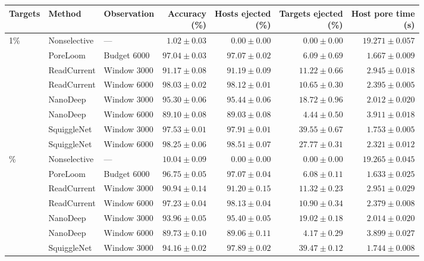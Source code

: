 \begingroup\setlength{\tabcolsep}{3.5pt}
\begin{tabular}{@{}lllrrrr@{}}
\toprule
Targets & Method & Observation & \shortstack{Accuracy\\(\%)} & \shortstack{Hosts ejected\\(\%)} & \shortstack{Targets ejected\\(\%)} & \shortstack{Host pore time\\(s)}\\\midrule
1\% & Nonselective & --- & $1.02 \pm 0.03$ & $0.00 \pm 0.00$ & $0.00 \pm 0.00$ & $19.271 \pm 0.057$\\
 & PoreLoom & Budget 6000 & $97.04 \pm 0.03$ & $97.07 \pm 0.02$ & $6.09 \pm 0.69$ & $1.667 \pm 0.009$\\
 & ReadCurrent & Window 3000 & $91.17 \pm 0.08$ & $91.19 \pm 0.09$ & $11.22 \pm 0.66$ & $2.945 \pm 0.018$\\
 & ReadCurrent & Window 6000 & $98.03 \pm 0.02$ & $98.12 \pm 0.01$ & $10.65 \pm 0.30$ & $2.395 \pm 0.005$\\
 & NanoDeep & Window 3000 & $95.30 \pm 0.06$ & $95.44 \pm 0.06$ & $18.72 \pm 0.96$ & $2.012 \pm 0.020$\\
 & NanoDeep & Window 6000 & $89.10 \pm 0.08$ & $89.03 \pm 0.08$ & $4.44 \pm 0.50$ & $3.911 \pm 0.018$\\
 & SquiggleNet & Window 3000 & $97.53 \pm 0.01$ & $97.91 \pm 0.01$ & $39.55 \pm 0.67$ & $1.753 \pm 0.005$\\
 & SquiggleNet & Window 6000 & $98.25 \pm 0.06$ & $98.51 \pm 0.07$ & $27.77 \pm 0.31$ & $2.321 \pm 0.012$\\
\addlinespace
10\% & Nonselective & --- & $10.04 \pm 0.09$ & $0.00 \pm 0.00$ & $0.00 \pm 0.00$ & $19.265 \pm 0.045$\\
 & PoreLoom & Budget 6000 & $96.75 \pm 0.05$ & $97.07 \pm 0.04$ & $6.08 \pm 0.11$ & $1.633 \pm 0.025$\\
 & ReadCurrent & Window 3000 & $90.94 \pm 0.14$ & $91.20 \pm 0.15$ & $11.32 \pm 0.23$ & $2.951 \pm 0.029$\\
 & ReadCurrent & Window 6000 & $97.23 \pm 0.04$ & $98.13 \pm 0.04$ & $10.90 \pm 0.34$ & $2.379 \pm 0.008$\\
 & NanoDeep & Window 3000 & $93.96 \pm 0.05$ & $95.40 \pm 0.05$ & $19.02 \pm 0.18$ & $2.014 \pm 0.020$\\
 & NanoDeep & Window 6000 & $89.73 \pm 0.10$ & $89.06 \pm 0.11$ & $4.17 \pm 0.29$ & $3.899 \pm 0.027$\\
 & SquiggleNet & Window 3000 & $94.16 \pm 0.02$ & $97.89 \pm 0.02$ & $39.47 \pm 0.12$ & $1.744 \pm 0.008$\\

\end{tabular}
